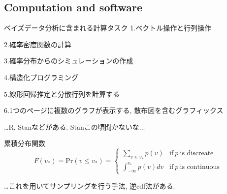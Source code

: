 \documentclass[11pt,a4pape,dvipdfmx]{jarticle}
\begin{document}
\subsection{Computation and software}
\begin{itembox}[l]{ベイズデータ分析に含まれる計算タスク}
1.ベクトル操作と行列操作

2.確率密度関数の計算

3.確率分布からのシミュレーションの作成

4.構造化プログラミング

5.線形回帰推定と分散行列を計算する

6.1つのページに複数のグラフが表示する, 散布図を含むグラフィックス
\end{itembox}

…R, Stanなどがある.
Stanこの頃聞かないな...

\begin{itembox}[l]{累積分布関数}
\[F(v_*)=\text{Pr}(v\leq v_*)
=\begin{cases}
\sum_{v\leq v_*} p(v) &\text{if}\ p\ \text{is discreate}\\
\int_{-\infty}^{v_*} p(v)dv &\text{if}\ p\ \text{is continuous}
\end{cases}\]
\end{itembox}

…これを用いてサンプリングを行う手法, 逆cdf法がある.
\end{document}
